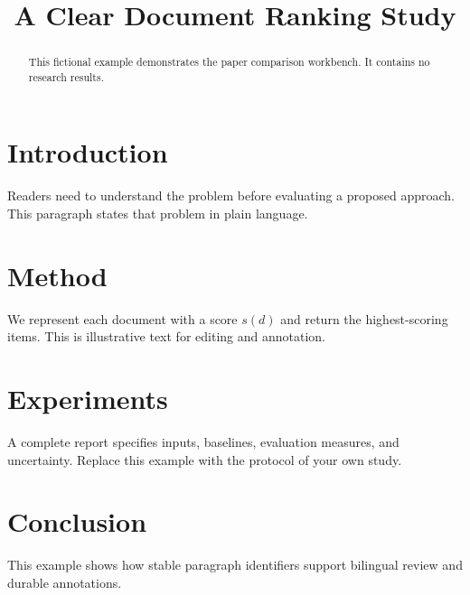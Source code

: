 \title{A Clear Document Ranking Study}

\begin{abstract}This fictional example demonstrates the paper comparison workbench. It contains no research results.\end{abstract}

\section{Introduction}

Readers need to understand the problem before evaluating a proposed approach. This paragraph states that problem in plain language.

\section{Method}

We represent each document with a score $s(d)$ and return the highest-scoring items. This is illustrative text for editing and annotation.

\section{Experiments}

A complete report specifies inputs, baselines, evaluation measures, and uncertainty. Replace this example with the protocol of your own study.

\section{Conclusion}

This example shows how stable paragraph identifiers support bilingual review and durable annotations.
